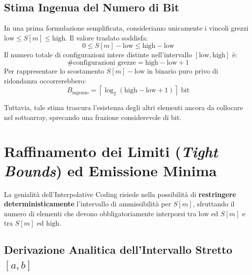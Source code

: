 \FloatBarrier
\subsection{Stima Ingenua del Numero di Bit}
\label{subsec:stima-ingenua-bit}

In una prima formulazione semplificata, consideriamo unicamente i vincoli grezzi $\text{low} \le S[m] \le \text{high}$. Il valore traslato soddisfa:
\begin{equation}
  0 \le S[m] - \text{low} \le \text{high} - \text{low}
\end{equation}
Il numero totale di configurazioni intere distinte nell'intervallo $[\text{low}, \text{high}]$ \`e:
\begin{equation}
  \#\text{configurazioni grezze} = \text{high} - \text{low} + 1
\end{equation}
Per rappresentare lo scostamento $S[m] - \text{low}$ in binario puro privo di ridondanza occorrerebbero:
\begin{equation}
  B_{\text{ingenuo}} = \left\lceil \log_2(\text{high} - \text{low} + 1) \right\rceil \text{ bit}
\end{equation}

Tuttavia, tale stima trascura l'esistenza degli altri elementi ancora da collocare nel sottoarray, sprecando una frazione considerevole di bit.

\FloatBarrier
\section{Raffinamento dei Limiti (\textit{Tight Bounds}) ed Emissione Minima}
\label{sec:raffinamento-limiti-stretti}

La genialit\`a dell'Interpolative Coding risiede nella possibilit\`a di \textbf{restringere deterministicamente} l'intervallo di ammissibilit\`a per $S[m]$, sfruttando il numero di elementi che devono obbligatoriamente interporsi tra $\text{low}$ ed $S[m]$ e tra $S[m]$ ed $\text{high}$.

\FloatBarrier
\subsection{Derivazione Analitica dell'Intervallo Stretto $[a, b]$}
\label{subsec:derivazione-intervallo-stretto}

